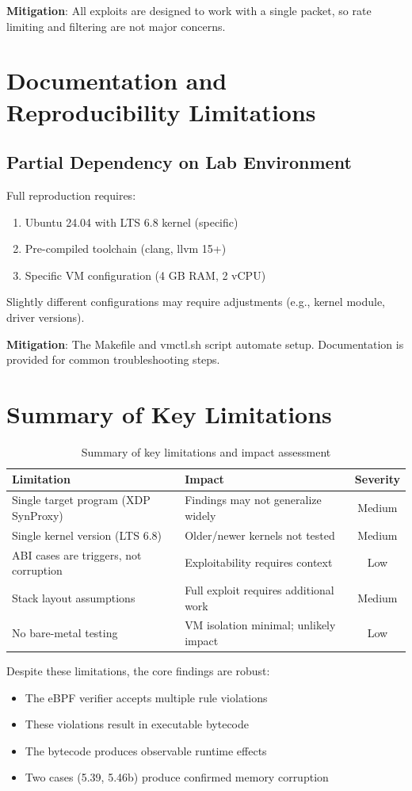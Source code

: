 \textbf{Mitigation}: All exploits are designed to work with a single packet, so rate limiting and filtering are not major concerns.

\section{Documentation and Reproducibility Limitations}

\subsection{Partial Dependency on Lab Environment}

Full reproduction requires:
\begin{enumerate}[label=\arabic*.]
  \item Ubuntu 24.04 with LTS 6.8 kernel (specific)
  \item Pre-compiled toolchain (clang, llvm 15+)
  \item Specific VM configuration (4 GB RAM, 2 vCPU)
\end{enumerate}

Slightly different configurations may require adjustments (e.g., kernel module, driver versions).

\textbf{Mitigation}: The Makefile and vmctl.sh script automate setup. Documentation is provided for common troubleshooting steps.

\section{Summary of Key Limitations}

\begin{table}[h]
\centering
\begin{tabular}{|l|l|c|}
\hline
\textbf{Limitation} & \textbf{Impact} & \textbf{Severity} \\
\hline
Single target program (XDP SynProxy) & Findings may not generalize widely & Medium \\
Single kernel version (LTS 6.8) & Older/newer kernels not tested & Medium \\
ABI cases are triggers, not corruption & Exploitability requires context & Low \\
Stack layout assumptions & Full exploit requires additional work & Medium \\
No bare-metal testing & VM isolation minimal; unlikely impact & Low \\
\hline
\end{tabular}
\caption{Summary of key limitations and impact assessment}
\end{table}

Despite these limitations, the core findings are robust:
\begin{itemize}
  \item The eBPF verifier accepts multiple rule violations
  \item These violations result in executable bytecode
  \item The bytecode produces observable runtime effects
  \item Two cases (5.39, 5.46b) produce confirmed memory corruption
\end{itemize}
